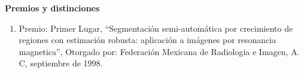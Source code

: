 {\large \textbf{Premios y distinciones}}

\hrulefill

\begin{enumerate}

\item Premio: Primer Lugar, “Segmentación semi-automática por crecimiento de regiones con estimación robusta: aplicación a imágenes por 
resonancia 
magnetica”, Otorgado por: Federación Mexicana de Radiologia e Imagen, A. C, septiembre de 1998.

\end{enumerate}

